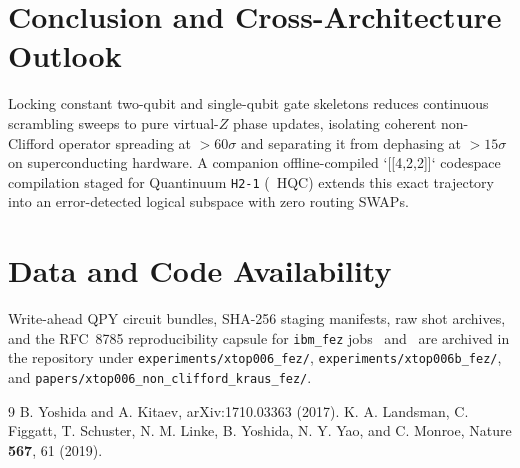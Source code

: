 \documentclass[aps,prx,twocolumn,superscriptaddress,nofootinbib]{revtex4-2}
\begin{document}
\section{Conclusion and Cross-Architecture Outlook}
Locking constant two-qubit and single-qubit gate skeletons reduces continuous scrambling sweeps to pure virtual-$Z$ phase updates, isolating coherent non-Clifford operator spreading at $>60\sigma$ and separating it from dephasing at $>15\sigma$ on superconducting hardware. A companion offline-compiled `[[4,2,2]]` codespace compilation staged for Quantinuum \texttt{H2-1} (\XtopHqcBudget\ HQC) extends this exact trajectory into an error-detected logical subspace with zero routing SWAPs.

\section*{Data and Code Availability}
Write-ahead QPY circuit bundles, SHA-256 staging manifests, raw shot archives, and the RFC~8785 reproducibility capsule for \texttt{ibm\_fez} jobs \XtopJobA\ and \XtopJobB\ are archived in the repository under \texttt{experiments/xtop006\_fez/}, \texttt{experiments/xtop006b\_fez/}, and \texttt{papers/xtop006\_non\_clifford\_kraus\_fez/}.

\begin{thebibliography}{9}
 B. Yoshida and A. Kitaev, arXiv:1710.03363 (2017).
 K. A. Landsman, C. Figgatt, T. Schuster, N. M. Linke, B. Yoshida, N. Y. Yao, and C. Monroe, Nature \textbf{567}, 61 (2019).
\end{thebibliography}
\end{document}
